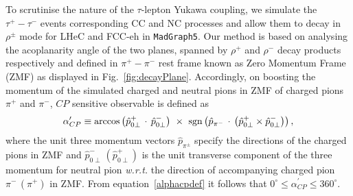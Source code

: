 \documentclass[pdftex,twocolumn,epjc3]{svjour3}          %
\begin{document}
\par To scrutinise the  nature of the $\tau$-lepton Yukawa coupling, we  simulate the $\tau^+-\tau^-$  events corresponding CC and NC processes and allow them to decay  in $\rho^\pm$ mode for LHeC and FCC-eh in \texttt{MadGraph5}. Our method is based  on analysing the acoplanarity angle of the two planes, spanned by $\rho^+$ and $\rho^-$ decay products respectively and defined in $\pi^+-\pi^-$ rest frame known as Zero Momentum Frame (ZMF) as displayed in Fig.~\ref{fig:decayPlane}. Accordingly, on boosting  the momentum of the simulated charged and neutral pions in ZMF of charged pions $\pi^+$ and $\pi^-$,  $CP$ sensitive observable is defined as
\begin{equation}
\alpha_{CP}^\prime \equiv \arccos\left (\hat{p}_{0\perp}^{+} \,\cdot\, \hat{p}_{0\perp}^{-}\right)\,\,\times\,\, {\rm sgn} \left(\hat{p}_{\pi^-}\, \cdot\, \left(\hat{p}_{0\perp}^{+} \times \hat{p}_{0\perp}^{-}\right)\right), \label{alphacpdef}
\end{equation}
where the unit three momentum vectors $\hat p_{\pi^{\pm}}$  specify the directions of the charged pions in ZMF  and $\hat p_{0\perp}^{-}\, \left(\hat p_{0\perp}^{+}\right)$ is the unit   transverse component of the three momentum for neutral pion {\it w.r.t.}  the direction of accompanying charged pion $\pi^-\,\left(\pi^+\right)$  in  ZMF. From equation~\eqref{alphacpdef} it follows that $0^\circ\le \alpha_{CP}^\prime\le 360^\circ$.
\end{document}
